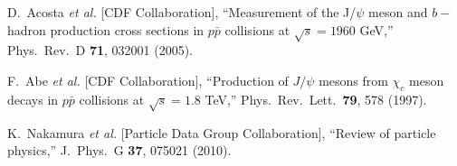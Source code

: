 \documentclass[aps,prc,preprint,superscriptaddress,showpacs,showkeys,amsmath]{revtex4-1}
\begin{document}
\begin{thebibliography}{100}
  D.~Acosta {\it et al.}  [CDF Collaboration],
  ``Measurement of the J/$\psi$ meson and $b-$hadron production cross sections in $p\bar{p}$ collisions at $\sqrt{s} = 1960$ GeV,''
  Phys.\ Rev.\ D {\bf 71}, 032001 (2005).


  F.~Abe {\it et al.} [CDF Collaboration],
  ``Production of $J/\psi$ mesons from $\chi_c$ meson decays in $p\bar{p}$ collisions at $\sqrt{s} = 1.8$ TeV,''
  Phys.\ Rev.\ Lett.\  {\bf 79}, 578 (1997).



  K.~Nakamura {\it et al.}  [Particle Data Group Collaboration],
  ``Review of particle physics,''
  J.\ Phys.\ G {\bf 37}, 075021 (2010).



\end{thebibliography}
\end{document}
